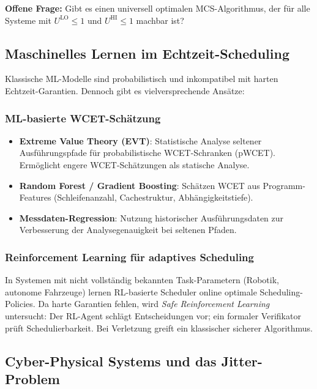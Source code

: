 ﻿\documentclass[a4paper,12pt]{report}
\theoremstyle{definition}
\begin{document}
\textbf{Offene Frage:} Gibt es einen universell optimalen MCS-Algorithmus,
der für alle Systeme mit $U^{\mathrm{LO}} \leq 1$ und $U^{\mathrm{HI}} \leq 1$
machbar ist?

\subsection{Maschinelles Lernen im Echtzeit-Scheduling}

Klassische ML-Modelle sind probabilistisch und inkompatibel mit harten
Echtzeit-Garantien. Dennoch gibt es vielversprechende Ansätze:

\subsubsection{ML-basierte WCET-Schätzung}

\begin{itemize}
	\item \textbf{Extreme Value Theory (EVT)}: Statistische Analyse seltener
	      Ausführungspfade für probabilistische WCET-Schranken (pWCET).
	      Ermöglicht engere WCET-Schätzungen als statische Analyse.
	\item \textbf{Random Forest / Gradient Boosting}: Schätzen WCET aus
	      Programm-Features (Schleifenanzahl, Cachestruktur, Abhängigkeitstiefe).
	\item \textbf{Messdaten-Regression}: Nutzung historischer Ausführungsdaten
	      zur Verbesserung der Analysegenauigkeit bei seltenen Pfaden.
\end{itemize}

\subsubsection{Reinforcement Learning für adaptives Scheduling}

In Systemen mit nicht vollständig bekannten Task-Parametern (Robotik, autonome
Fahrzeuge) lernen RL-basierte Scheduler online optimale Scheduling-Policies.
Da harte Garantien fehlen, wird \emph{Safe Reinforcement Learning} untersucht:
Der RL-Agent schlägt Entscheidungen vor; ein formaler Verifikator prüft
Schedulierbarkeit. Bei Verletzung greift ein klassischer sicherer Algorithmus.

\subsection{Cyber-Physical Systems und das Jitter-Problem}
\end{document}
